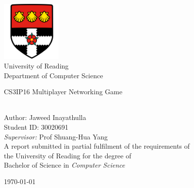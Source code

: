 \documentclass[a4paper,11pt,oneside]{book}
\begin{document}
    
    \frontmatter
    
    \begin{titlepage}      
        \begin{center}
            \includegraphics[width=3cm]{figures/uorlogo.png}\\[0.5cm]
            {\LARGE University of Reading\\[0.5cm]
            Department of Computer Science}\\[2cm]
			
            \linespread{1.2}\huge {
                CS3IP16 Multiplayer Networking Game
            
            }
            \linespread{1}~\\[2cm]
            {\Large 
                Author: Jaweed Inayathulla\\
                Student ID: 30020691
            }\\[1cm] 
            

            {\large 
                \emph{Supervisor:} Prof Shuang-Hua Yang}\\[1cm] %
            
            \large A report submitted in partial fulfilment of the requirements of\\the University of Reading for the degree of\\ Bachelor of Science in \textit{Computer Science}\\[0.3cm] 
            \vfill
            
            
            \today %
        \end{center}
    \end{titlepage}
    
\end{document}
